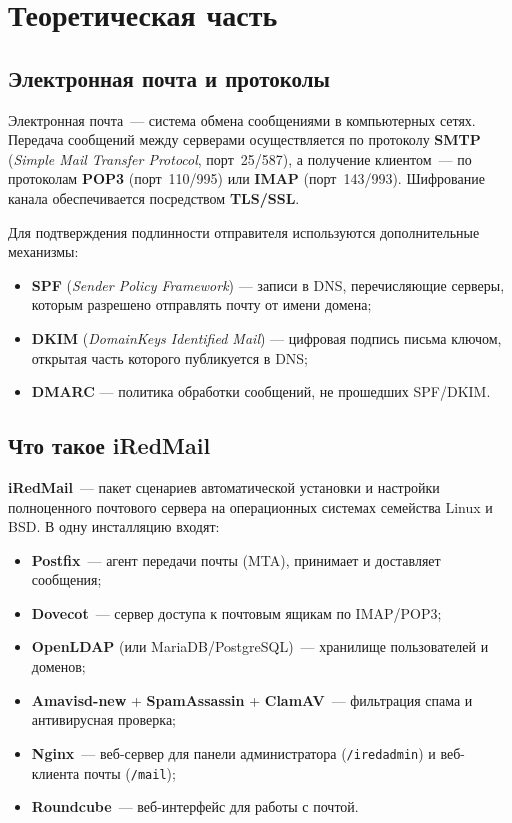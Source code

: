 \chapter{Теоретическая часть}
\label{ch:theory}

\section{Электронная почта и протоколы}

Электронная почта~--- система обмена сообщениями в компьютерных сетях.
Передача сообщений между серверами осуществляется по протоколу
\textbf{SMTP} (\textit{Simple Mail Transfer Protocol}, порт~25/587),
а получение клиентом~--- по протоколам \textbf{POP3} (порт~110/995)
или \textbf{IMAP} (порт~143/993). Шифрование канала обеспечивается
посредством \textbf{TLS/SSL}.

Для подтверждения подлинности отправителя используются дополнительные механизмы:
\begin{itemize}
  \item \textbf{SPF} (\textit{Sender Policy Framework}) --- записи в DNS,
        перечисляющие серверы, которым разрешено отправлять почту от имени домена;
  \item \textbf{DKIM} (\textit{DomainKeys Identified Mail}) --- цифровая подпись
        письма ключом, открытая часть которого публикуется в DNS;
  \item \textbf{DMARC} --- политика обработки сообщений, не прошедших SPF/DKIM.
\end{itemize}

\section{Что такое iRedMail}

\textbf{iRedMail}~--- пакет сценариев автоматической установки и настройки
полноценного почтового сервера на операционных системах семейства Linux и BSD.
В одну инсталляцию входят:
\begin{itemize}
  \item \textbf{Postfix}~--- агент передачи почты (MTA), принимает и
        доставляет сообщения;
  \item \textbf{Dovecot}~--- сервер доступа к почтовым ящикам по IMAP/POP3;
  \item \textbf{OpenLDAP} (или MariaDB/PostgreSQL)~--- хранилище пользователей
        и доменов;
  \item \textbf{Amavisd-new} + \textbf{SpamAssassin} + \textbf{ClamAV}~---
        фильтрация спама и антивирусная проверка;
  \item \textbf{Nginx}~--- веб-сервер для панели администратора
        (\texttt{/iredadmin}) и веб-клиента почты (\texttt{/mail});
  \item \textbf{Roundcube}~--- веб-интерфейс для работы с почтой.
\end{itemize}

